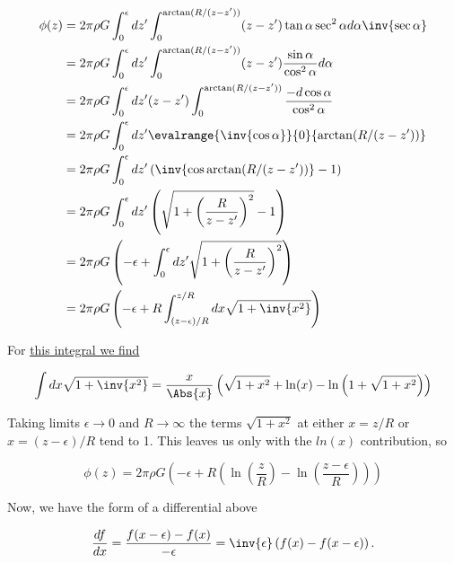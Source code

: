 \begin{align*}
\phi(z) 
&= 
2 \pi \rho G \int_0^\epsilon dz' \int_0^{\arctan(R/(z-z'))} (z - z') \tan \alpha \sec^2 \alpha d\alpha \inv{ \sec\alpha} \\
&= 
2 \pi \rho G \int_0^\epsilon dz' \int_0^{\arctan(R/(z-z'))} (z - z') \frac{\sin \alpha}{\cos^2\alpha} d\alpha \\
&= 
2 \pi \rho G \int_0^\epsilon dz' (z - z')\int_0^{\arctan(R/(z-z'))} \frac{-d\cos \alpha}{\cos^2\alpha} \\
&= 
2 \pi \rho G \int_0^\epsilon dz' \evalrange{\inv{\cos\alpha}}{0}{\arctan(R/(z-z'))} \\
&= 
2 \pi \rho G \int_0^\epsilon dz' \left( \inv{\cos\arctan(R/(z-z'))} -1 \right) \\
&= 
2 \pi \rho G \int_0^\epsilon dz' \left( \sqrt{1 + \left(\frac{R}{z-z'}\right)^2} -1 \right) \\
&=
2 \pi \rho G 
\left( -\epsilon +
\int_0^\epsilon dz' 
\sqrt{1 + \left(\frac{R}{z-z'}\right)^2} \right)  \\
&=
2 \pi \rho G 
\left( -\epsilon + R
\int_{(z - \epsilon)/R}^{z/R} dx
\sqrt{1 + \inv{x^2}}
\right)
\end{align*}

For \href{https://raw.github.com/peeterjoot/physicsplay/master/notes/phy454/continuumProblemSet1Q3.cdf}{this integral we find}

\begin{equation}\label{eqn:classicalMechanicsPs2:270}
\int dx \sqrt{1 + \inv{x^2}} 
=
\frac{x}{\Abs{x}}
\left(\sqrt{1+x^2}+\ln(x)-\ln\left(1+\sqrt{1+x^2}\right)\right)
\end{equation}

Taking limits $\epsilon \rightarrow 0$ and $R \rightarrow \infty$ the terms
$\sqrt{1 + x^2}$ at either $x = z/R$ or $x = (z-\epsilon)/R$ tend to 1.  This leaves us only with the $ln(x)$ contribution, so

\begin{equation}\label{eqn:classicalMechanicsPs2:290}
\phi(z) =
2 \pi \rho G 
\left( -\epsilon + R \left( 
\ln\left(\frac{z}{R}\right) -\ln\left(\frac{z - \epsilon}{R}\right) \right)\right)
\end{equation}

Now, we have the form of a differential above

\begin{equation}\label{eqn:classicalMechanicsPs2:310}
\frac{df}{dx} = \frac{f(x - \epsilon) - f(x)}{-\epsilon} = \inv{\epsilon} \left( f(x) - f(x - \epsilon) \right).
\end{equation}


